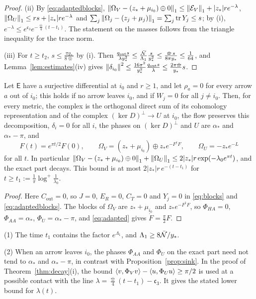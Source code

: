 \begin{proof}
(ii) By \eqref{eq:adaptedblocks},
$\left\lVert\Omega_V-(z_\ast+\mu_{i_0})\oplus0\right\rVert_1\leq\left\lVert\mathcal E_V\right\rVert_1+|z_\ast|re^{-\lambda}$,
$\left\lVert\Omega_U\right\rVert_1\leq rs+|z_\ast|re^{-\lambda}$ and
$\sum_j\left\lVert\Omega_j-(z_j+\mu_j)\right\rVert_1=\sum_j\operatorname{tr} Y_j\leq s$; by (i),
$e^{-\lambda}\leq e^{\mathfrak c_3}e^{-\frac{\bar\varpi}4(t-t_1)}$. The statement
on the masses follows from the triangle inequality for the trace norm.

(iii) For $t\geq t_2$, $s\leq\frac{\pi y_\ast}{8\bar\varpi}$ by (i). Then
$\frac{q_{\mathrm{out}}s}{\lambda y_\ast^2}\leq\frac{\bar{\mathcal N}}{\Lambda_1}\frac s{y_\ast^2}
\leq\frac{\bar\varpi\,s}{8\pi y_\ast}\leq\frac1{64}$, and
Lemma~\ref{lem:estimates}(iv) gives
$\left\lVert\delta_{i_0}\right\rVert^2\leq\frac{16\pi^2}{y_\ast^2}\frac{q_{\mathrm{out}}s}\lambda
\leq\frac{2\pi\bar\varpi}{y_\ast}s$.
\end{proof}

\begin{proposition}\label{prop:sink}
Let $\mathsf E$ have a surjective differential at $i_0$ and $r\geq1$, and
let $\rho_a=0$ for every arrow $a$ out of $i_0$; this holds if no arrow leaves
$i_0$, and if $W_j=0$ for all $j\neq i_0$. Then, for every metric, the complex is the orthogonal
direct sum of its cohomology representation and of the complex
$(\ker D)^\perp\to U$ at $i_0$, the flow preserves this decomposition,
$\delta_i=0$ for all $i$, the phases on $(\ker D)^\perp$ and $U$ are
$\alpha_\ast$ and $\alpha_\ast-\pi$, and
\[
 F(t)=e^{\pi t/2}F(0),\qquad
 \Omega_V=(z_\ast+\mu_{i_0})\oplus z_\ast e^{-F^\dagger F},\qquad
 \Omega_U=-z_\ast e^{-L}
\]
for all $t$. In particular
$\left\lVert\Omega_V-(z_\ast+\mu_{i_0})\oplus0\right\rVert_1+\left\lVert\Omega_U\right\rVert_1
\leq2|z_\ast|r\exp(-\lambda_0e^{\pi t})$, and the exact part decays. This
bound is at most $2|z_\ast|r\,e^{-(t-t_1)}$ for
$t\geq t_1:=\frac1\pi\log^+\frac1{\lambda_0}$.
\end{proposition}

\begin{proof}
Here $C_{\mathrm{out}}=0$, so $J=0$, $E_R=0$, $C_T=0$ and $Y_j=0$ in
\eqref{eq:blocks} and \eqref{eq:adaptedblocks}. The blocks of $\Omega_V$ are
$z_\ast+\mu_{i_0}$ and $z_\ast e^{-F^\dagger F}$, so $\Phi_{HA}=0$,
$\Phi_{AA}=\alpha_\ast$, $\Phi_U=\alpha_\ast-\pi$, and \eqref{eq:adapted} gives
$\dot F=\frac\pi2F$.
\end{proof}

\begin{remark}\label{rem:decay}
(1) The time $t_1$ contains the factor $e^{\Lambda_1}$, and
$\Lambda_1\geq8\bar{\mathcal N}/y_\ast$.

(2) When an arrow leaves $i_0$, the phases $\Phi_{AA}$ and $\Phi_U$ on the
exact part need not tend to $\alpha_\ast$ and $\alpha_\ast-\pi$, in contrast
with Proposition~\ref{prop:sink}. In the proof of Theorem~\ref{thm:decay}(i), the bound
$\left\langle v,\Phi_Vv\right\rangle-\left\langle u,\Phi_Uu\right\rangle\geq\pi/2$ is used at a possible
contact with the line $\lambda=\frac{\bar\varpi}4(t-t_1)-\mathfrak c_3$.
It gives the stated lower bound for $\lambda(t)$.
\end{remark}
